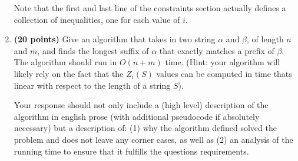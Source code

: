 \documentclass[11pt, oneside]{article}   	%
\begin{document}
\begin{enumerate}
\begin{tcolorbox}[colback=blue!5,colframe=blue!75!black,title=Writing down an ILP]
Note that the first and last line of the constraints section actually defines a collection of inequalities, one for each value of $i$. 
\end{tcolorbox}

\item \textbf{(20 points)} 
Give an algorithm that takes in two string $\alpha$ and $\beta$, of length $n$ and $m$, and finds the longest suffix of $\alpha$ that exactly matches a prefix of $\beta$. 
The algorithm should run in $O(n+m)$ time. 
(Hint: your algorithm will likely rely on the fact that the $Z_{i}(S)$ values can be computed in time thats linear with respect to the length of a string $S$). 

Your response should not only include a (high level) description of the algorithm in english prose (with additional pseudocode if absolutely necessary) 
but a description of: (1) why the algorithm defined solved the problem and does not leave any corner cases, 
as well as (2) an analysis of the running time to ensure that it fulfills the questions requirements. 
\end{enumerate}
\end{document}
